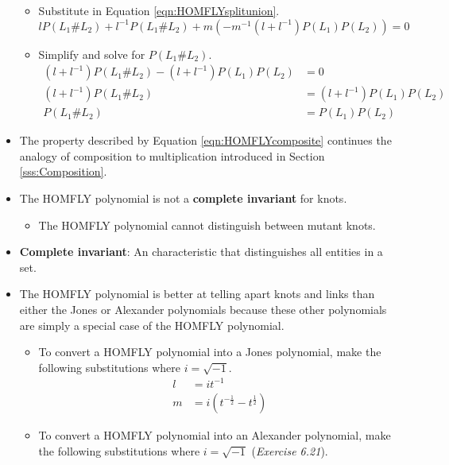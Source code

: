 \documentclass[titlepage]{article}
\numberwithin{figure}{section}
\numberwithin{table}{section}
\numberwithin{equation}{section}
\begin{document}
\begin{itemize}
\begin{itemize}
\begin{equation*}
        \end{equation*}
        \item Substitute in Equation \ref{eqn:HOMFLYsplitunion}.
        \begin{equation*}
            lP(L_1\#L_2)+l^{-1}P(L_1\#L_2)+m\left( -m^{-1}\left( l+l^{-1} \right)P(L_1)P(L_2) \right)=0
        \end{equation*}
        \item Simplify and solve for $P(L_1\#L_2)$.
        \begin{align*}
            \left( l+l^{-1} \right)P(L_1\#L_2)-\left( l+l^{-1} \right)P(L_1)P(L_2) &=0\\
            \left( l+l^{-1} \right)P(L_1\#L_2) &=\left( l+l^{-1} \right)P(L_1)P(L_2)\\
            P(L_1\#L_2) &=P(L_1)P(L_2)
        \end{align*}
    \end{itemize}
    \item The property described by Equation \ref{eqn:HOMFLYcomposite} continues the analogy of composition to multiplication introduced in Section \ref{sss:Composition}.
    \item The HOMFLY polynomial is not a \textbf{complete invariant} for knots.
    \begin{itemize}
        \item The HOMFLY polynomial cannot distinguish between mutant knots.
    \end{itemize}
    \item \textbf{Complete invariant}: An characteristic that distinguishes all entities in a set.
    \item The HOMFLY polynomial is better at telling apart knots and links than either the Jones or Alexander polynomials because these other polynomials are simply a special case of the HOMFLY polynomial.
    \begin{itemize}
        \item To convert a HOMFLY polynomial into a Jones polynomial, make the following substitutions where $i=\sqrt{-1}$.
        \begin{align*}
            l &= it^{-1}\\
            m &= i\left( t^{-\frac{1}{2}}-t^\frac{1}{2} \right)
        \end{align*}
        \item To convert a HOMFLY polynomial into an Alexander polynomial, make the following substitutions where $i=\sqrt{-1}$ (\emph{Exercise 6.21}).
        \begin{align*}

\end{align*}
\end{itemize}
\end{itemize}
\end{document}
